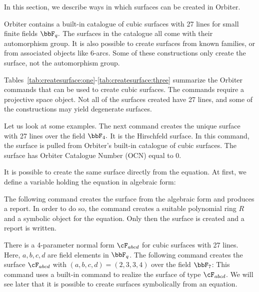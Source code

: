 In this section, we describe ways in which surfaces can be created in Orbiter. 

\bigskip

Orbiter contains a built-in catalogue of cubic surfaces with 27 
lines for small finite fields $\bbF_q.$ 
The surfaces in the catalogue all come with their automorphism group.
It is also possible to create surfaces from known families, 
or from associated objects like 6-arcs. 
Some of these constructions only create the surface, 
not the automorphism group.

\bigskip

Tables~\ref{tab:createsurface:one}-\ref{tab:createsurface:three} 
summarize the Orbiter commands that can be used
to create cubic surfaces. 
The commands require a projective space object.
Not all of the surfaces created have 27 lines, 
and some of the constructions may yield degenerate surfaces. 




Let us look at some examples. 
The next command creates the unique surface with 27 lines 
over the field $\bbF_4.$ 
It is the Hirschfeld surface. 
In this command, 
the surface is pulled from Orbiter's built-in catalogue of cubic surfaces. 
The surface has Orbiter Catalogue Number (OCN) equal to 0.



\bigskip


It is possible to create the same surface directly from the equation. 
At first, we define a variable holding the equation in algebraic form:



The following command creates the surface from the algebraic form and produces a report. 
In order to do so, the command creates a suitable polynomial ring $R$ and a symbolic object for the equation. 
Only then the surface is created and a report is written. 



\bigskip


There is a 4-parameter normal form $\cF_{abcd}$ for 
cubic surfaces with 27 lines. Here, $a,b,c,d$ are field elements in $\bbF_q$.
The following command creates the surface $\cF_{abcd}$ 
with $(a,b,c,d)=(2,3,3,4)$ over the field $\bbF_7$:
This command uses a built-in 
command to realize the surface of type $\cF_{abcd}$. 
We will see later that it is possible to 
create surfaces symbolically from an equation.

